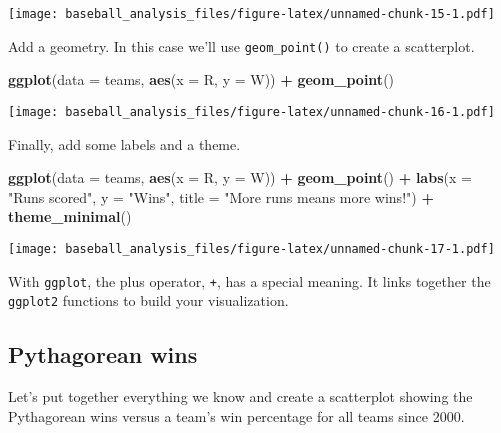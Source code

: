 \documentclass[
]{article}
\newenvironment{Shaded}{\begin{snugshade}}{\end{snugshade}}
\newcommand{\DataTypeTok}[1]{\textcolor[rgb]{0.13,0.29,0.53}{#1}}
\newcommand{\KeywordTok}[1]{\textcolor[rgb]{0.13,0.29,0.53}{\textbf{#1}}}
\newcommand{\NormalTok}[1]{#1}
\newcommand{\OperatorTok}[1]{\textcolor[rgb]{0.81,0.36,0.00}{\textbf{#1}}}
\newcommand{\StringTok}[1]{\textcolor[rgb]{0.31,0.60,0.02}{#1}}
\begin{document}
\texttt{[image: baseball\_analysis\_files/figure-latex/unnamed-chunk-15-1.pdf]}

Add a geometry. In this case we'll use \texttt{geom\_point()} to create
a scatterplot.

\begin{Shaded}
\begin{Highlighting}[]
\KeywordTok{ggplot}\NormalTok{(}\DataTypeTok{data =}\NormalTok{ teams, }\KeywordTok{aes}\NormalTok{(}\DataTypeTok{x =}\NormalTok{ R, }\DataTypeTok{y =}\NormalTok{ W)) }\OperatorTok{+}
\StringTok{  }\KeywordTok{geom_point}\NormalTok{()}
\end{Highlighting}
\end{Shaded}

\texttt{[image: baseball\_analysis\_files/figure-latex/unnamed-chunk-16-1.pdf]}

Finally, add some labels and a theme.

\begin{Shaded}
\begin{Highlighting}[]
\KeywordTok{ggplot}\NormalTok{(}\DataTypeTok{data =}\NormalTok{ teams, }\KeywordTok{aes}\NormalTok{(}\DataTypeTok{x =}\NormalTok{ R, }\DataTypeTok{y =}\NormalTok{ W)) }\OperatorTok{+}
\StringTok{  }\KeywordTok{geom_point}\NormalTok{() }\OperatorTok{+}
\StringTok{  }\KeywordTok{labs}\NormalTok{(}\DataTypeTok{x =} \StringTok{"Runs scored"}\NormalTok{, }\DataTypeTok{y =} \StringTok{"Wins"}\NormalTok{, }\DataTypeTok{title =} \StringTok{"More runs means more wins!"}\NormalTok{) }\OperatorTok{+}
\StringTok{  }\KeywordTok{theme_minimal}\NormalTok{()}
\end{Highlighting}
\end{Shaded}

\texttt{[image: baseball\_analysis\_files/figure-latex/unnamed-chunk-17-1.pdf]}

With \texttt{ggplot}, the plus operator, \texttt{+}, has a special
meaning. It links together the \texttt{ggplot2} functions to build your
visualization.

\hypertarget{pythagorean-wins}{%
\subsection{Pythagorean wins}\label{pythagorean-wins}}

Let's put together everything we know and create a scatterplot showing
the Pythagorean wins versus a team's win percentage for all teams since
2000.
\end{document}
